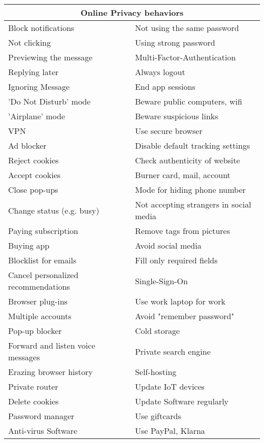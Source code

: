 \begin{table}[H]
    \centering
\begin{tabular}{ |p{7.5cm}||p{7.5cm}|  }
\hline
    \multicolumn{2}{|c|}{Online Privacy behaviors} \\
\hline
\hline

    Block notifications & Not using the same password\\
    Not clicking & Using strong password\\
    Previewing the message & Multi-Factor-Authentication\\
    Replying later & Always logout\\
    Ignoring Message & End app sessions\\
    'Do Not Disturb' mode & Beware public computers, wifi\\
    'Airplane' mode & Beware suspicious links\\
    VPN & Use secure browser\\
    Ad blocker & Disable default tracking settings\\
    Reject cookies & Check authenticity of website\\
    Accept cookies & Burner card, mail, account\\
    Close pop-ups & Mode for hiding phone number\\
    Change status (e.g. busy) & Not accepting strangers in social media\\
    Paying subscription & Remove tags from pictures\\
    Buying app & Avoid social media\\
    Blocklist for emails & Fill only required fields\\
    Cancel personalized recommendations & Single-Sign-On\\
    Browser plug-ins & Use work laptop for work\\
    Multiple accounts & Avoid "remember password"\\
    Pop-up blocker & Cold storage\\
    Forward and listen voice messages & Private search engine\\
    Erazing browser history & Self-hosting\\
    Private router & Update IoT devices\\
    Delete cookies & Update Software regularly\\
    Password manager & Use giftcards\\
    Anti-virus Software & Use PayPal, Klarna\\

\end{tabular}
\end{table}
